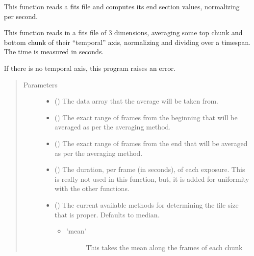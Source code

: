 \documentclass[letterpaper,10pt,english]{sphinxmanual}
\begin{document}
\begin{fulllineitems}
\label{\detokenize{docstrings/ifa_smeargle.reformat.collapse:ifa_smeargle.reformat.collapse.collapse_by_average_endpoints_per_second}}
This function reads a fits file and computes its end section
values, normalizing per second.

This function reads in a fits file of 3 dimensions, averaging
some top chunk and bottom chunk of their “temporal” axis,
normalizing and dividing over a timespan. The time is measured
in seconds.

If there is no temporal axis, this program raises an error.
\begin{quote}\begin{description}
\item[{Parameters}] \leavevmode\begin{itemize}
\item {} 
 () \textendash{} The data array that the average will be taken from.

\item {} 
 () \textendash{} The exact range of frames from the beginning that will be
averaged as per the averaging method.

\item {} 
 () \textendash{} The exact range of frames from the end that will be averaged
as per the averaging method.

\item {} 
 () \textendash{} The duration, per frame (in seconds), of each exposure.
This is really not used in this function, but, it is added
for uniformity with the other functions.

\item {} 
 (\sphinxstyleliteralemphasis{\sphinxupquote{ (}}\sphinxstyleliteralemphasis{\sphinxupquote{)}}) \textendash{} 
The current available methods for determining the file size
that is proper. Defaults to median.
\begin{itemize}
\item {} \begin{description}
\item[{’mean’}] \leavevmode
This takes the mean along the frames of each
chunk


\end{description}
\end{itemize}
\end{itemize}
\end{description}
\end{quote}
\end{fulllineitems}
\end{document}
